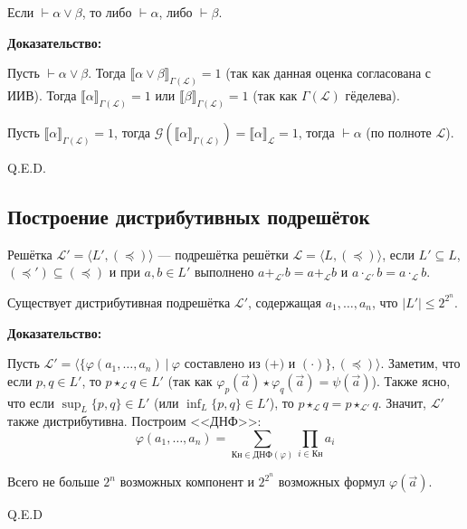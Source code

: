 
Если $\vdash \alpha\vee\beta$, то либо $\vdash\alpha$, либо $\vdash\beta$.

\textbf{Доказательство:}

Пусть $\vdash\alpha\vee\beta$. Тогда $\llbracket\alpha\vee\beta\rrbracket_{\Gamma(\mathcal{L})} = 1$
(так как данная оценка согласована с ИИВ). Тогда $\llbracket\alpha\rrbracket_{\Gamma(\mathcal{L})} = 1$ или
$\llbracket\beta\rrbracket_{\Gamma(\mathcal{L})} = 1$ (так как $\Gamma(\mathcal{L})$ гёделева). 

Пусть $\llbracket\alpha\rrbracket_{\Gamma(\mathcal{L})} = 1$, 
тогда $\mathcal{G}(\llbracket\alpha\rrbracket_{\Gamma(\mathcal{L})}) = \llbracket\alpha\rrbracket_\mathcal{L} = 1$, 
тогда $\vdash\alpha$ (по полноте $\mathcal{L}$).

\hfill Q.E.D.

\subsection{Построение дистрибутивных подрешёток}

 Решётка $\mathcal{L'} = \langle L', (\preceq) \rangle$ --- подрешётка решётки $\mathcal{L} = \langle L, (\preceq) \rangle$, 
если $L' \subseteq L$, $(\preceq') \subseteq (\preceq)$ и 
при $a,b \in L'$ выполнено $a +_{\mathcal{L'}} b = a +_{\mathcal{L}} b$ и $a \cdot_{\mathcal{L'}} b = a \cdot_{\mathcal{L}} b$.


Существует дистрибутивная подрешётка $\mathcal{L'}$, содержащая
$a_1, \dots, a_n$, что $|L'| \le 2^{2^n}$.


\textbf{Доказательство:}

Пусть $\mathcal{L'} = \langle\{ \varphi(a_1,\dots,a_n)\ |\ \varphi \text{ составлено из (+) и }(\cdot)\}, (\preceq)\rangle$.
Заметим, что если $p,q \in L'$, то $p \star_{\mathcal{L}} q \in L'$ 
(так как $\varphi_p(\overrightarrow{a})\star\varphi_q(\overrightarrow{a}) = \psi(\overrightarrow{a})$). Также ясно,
что если $\sup_L\{p,q\} \in L'$ (или $\inf_L\{p,q\} \in L'$), то $p \star_{\mathcal{L}} q = p \star_{\mathcal{L'}} q$.
Значит, $\mathcal{L'}$ также дистрибутивна. Построим <<ДНФ>>:
$$\varphi(a_1,\dots,a_n) = \sum_{\text{Кн} \in \text{ДНФ}(\varphi)}\prod_{i \in \text{Кн}}a_i$$

Всего не больше $2^n$ возможных компонент и $2^{2^n}$ возможных формул $\varphi(\overrightarrow{a})$.

\hfill Q.E.D


